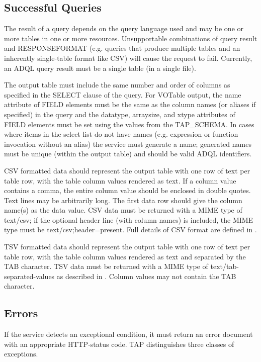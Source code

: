 \documentclass[11pt,letter]{ivoa}
\newcommand{\tapschema}{TAP\_SCHE\-MA}
\newcommand{\tapschema}{\mbox{%
  \relsize{-0.5}TAP\discretionary{-}{}{\kern-2pt\_}SCHEMA}}
\begin{document}
\subsection{Successful Queries}
\label{sec:query-ok}

The result of a query depends on the query language used and may be one or more 
tables in one or more resources. Unsupportable combinations of query result and 
RESPONSEFORMAT (e.g. queries that produce multiple tables and an inherently 
single-table format like CSV) will cause the request to fail. Currently, an ADQL 
query result must be a single table (in a single file).

The output table must include the same number and order of columns as specified 
in the SELECT clause of the query. For VOTable output, the name attribute of 
FIELD elements must be the same as the column names (or aliases if specified)  
in the query and the datatype, arraysize, and xtype 
attributes of FIELD elements must be set using the values from the \tapschema. 
In cases where items in the select list do not 
have names (e.g. expression or function invocation without an alias) the service 
must generate a name; 
generated names must be unique (within the output table) and should be valid 
ADQL identifiers.

CSV formatted data should represent the output table with one row of text per 
table row, with the table column values rendered as text. 
If a column value contains a comma, the entire column value should be 
enclosed in double quotes.  Text lines may be arbitrarily long.  The first data 
row should give the column name(s) as the data value.   CSV data must be returned 
with a MIME type of text/csv; if the optional header line (with column names) 
is included, the MIME type must be text/csv;header=present. Full details of CSV 
format are defined in \citet{std:CSV}.

TSV formatted data should represent the output table with one row of text per 
table row, with the table column values rendered as text and separated by the 
TAB character. TSV data must be returned with a MIME type of 
text/tab-separated-values as described in
\citet{std:TSV}. Column values may not contain the 
TAB 
character.

\subsection{Errors}
\label{sec:query-error}

If the service detects an exceptional condition, it must return an error 
document with an appropriate HTTP-status code. TAP distinguishes three classes 
of exceptions.
\end{document}
